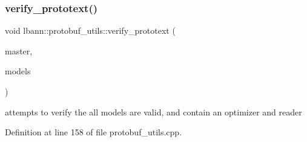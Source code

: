 \subsubsection{\texorpdfstring{verify\+\_\+prototext()}{verify\_prototext()}}
{\footnotesize\ttfamily void lbann\+::protobuf\+\_\+utils\+::verify\+\_\+prototext (\begin{DoxyParamCaption}\item[{bool}]{master,  }\item[{const std\+::vector$<$ lbann\+\_\+data\+::\+Lbann\+PB $\ast$$>$ \&}]{models }\end{DoxyParamCaption})\hspace{0.3cm}{\ttfamily [static]}}

attempts to verify the all models are valid, and contain an optimizer and reader 

Definition at line 158 of file protobuf\+\_\+utils.\+cpp.


